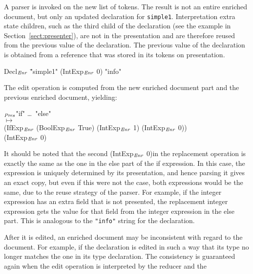 \documentclass{speauth}
\begin{document}
A parser is invoked on the new list of tokens. The result is not an entire enriched document, but only an updated declaration for \verb|simple1|. Interpretation extra state children, such as the third child of the declaration (see the example in Section~\ref{sect:presenter}), are not in the presentation and are therefore reused from the previous value of the declaration. The previous value of the declaration is obtained from a reference that was stored in its tokens on presentation. 

\small \ttfamily
\begin{tabbing}
Decl$_{\mathit{Enr}}$ \= "simple1" (IntExp$_{\mathit{Enr}}$ 0) "info"
\end{tabbing}
\rmfamily \normalsize

The edit operation is computed from the new enriched document part and the previous enriched document, yielding:

\small \ttfamily
\begin{tabbing}
$_{\mathit{Pres}}$\ttfamily  "if" \dots~"else"\\
$\mapsto$\\
  \ttfamily (IfExp$_{\mathit{Enr}}$ (BoolExp$_{\mathit{Enr}}$ True) (IntExp$_{\mathit{Enr}}$ 1) (IntExp$_{\mathit{Enr}}$ 0))\\
  \ttfamily (IntExp$_{\mathit{Enr}}$ 0) 
\end{tabbing}
\rmfamily \normalsize

It should be noted that the second \ttfamily (IntExp$_{\mathit{Enr}}$ 0)\rmfamily in the replacement operation is exactly the same as the one in the else part of the if expression. In this case, the expression is uniquely determined by its presentation, and hence parsing it gives an exact copy, but even if this were not the case, both expressions would be the same, due to the reuse strategy of the parser. For example, if the integer expression has an extra field that is not presented, the replacement integer expression gets the value for that field from the integer expression in the else part. This is analogous to the \verb|"info"| string for the declaration.


\bc
After it is edited, an enriched document may be inconsistent with regard to the document. For example, if the declaration is edited in such a way that its type no longer matches the one in its type declaration. The consistency is guaranteed again when the edit operation is interpreted by the reducer and the 
\ec
\end{document}
